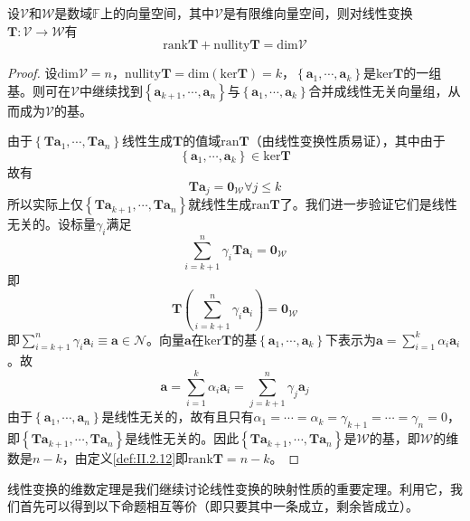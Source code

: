 \documentclass[main.tex]{subfiles}
\begin{document}
\begin{theorem}[线性变换的维数定理]\label{thm:II.2.8}
    设$\mathcal{V}$和$\mathcal{W}$是数域$\mathbb{F}$上的向量空间，其中$\mathcal{V}$是有限维向量空间，则对线性变换$\mathbf{T}:\mathcal{V}\rightarrow\mathcal{W}$有
    \[
        \mathrm{rank}\mathbf{T}+\mathrm{nullity}\mathbf{T}=\mathrm{dim}\mathcal{V}
    \]
\end{theorem}
\begin{proof}
    设$\mathrm{dim}\mathcal{V}=n$，$\mathrm{nullity}\mathbf{T}=\mathrm{dim}\left(\mathrm{ker}\mathbf{T}\right)=k$，$\left\{\mathbf{a}_1,\cdots,\mathbf{a}_k\right\}$是$\mathrm{ker}\mathbf{T}$的一组基。则可在$\mathcal{V}$中继续找到$\left\{\mathbf{a}_{k+1},\cdots,\mathbf{a}_{n}\right\}$与$\left\{\mathbf{a}_1,\cdots,\mathbf{a}_k\right\}$合并成线性无关向量组，从而成为$\mathcal{V}$的基。

    由于$\left\{\mathbf{Ta}_1,\cdots,\mathbf{Ta}_n\right\}$线性生成$\mathbf{T}$的值域$\mathrm{ran}\mathbf{T}$（由线性变换性质易证），其中由于
    \[\left\{\mathbf{a}_1,\cdots,\mathbf{a}_k\right\}\in\mathrm{ker}\mathbf{T}\]
    故有
    \[\mathbf{Ta}_j=\mathbf{0}_{\mathcal{W}}\forall j\leq k\]
    所以实际上仅$\left\{\mathbf{Ta}_{k+1},\cdots,\mathbf{Ta}_n\right\}$就线性生成$\mathrm{ran}\mathbf{T}$了。我们进一步验证它们是线性无关的。设标量$\gamma_i$满足
    \[\sum_{i=k+1}^n\gamma_i\mathbf{Ta}_i=\mathbf{0}_{\mathcal{W}}\]
    即
    \[\mathbf{T}\left(\sum_{i=k+1}^n\gamma_i\mathbf{a}_i\right)=\mathbf{0}_{\mathcal{W}}\]
    即$\sum_{i=k+1}^n\gamma_i\mathbf{a}_i\equiv\mathbf{a}\in\mathcal{N}$。向量$\mathbf{a}$在$\mathrm{ker}\mathbf{T}$的基$\left\{\mathbf{a}_1,\cdots,\mathbf{a}_k\right\}$下表示为$\mathbf{a}=\sum_{i=1}^k\alpha_i\mathbf{a}_i$。故
    \[
        \mathbf{a}=\sum_{i=1}^k\alpha_i\mathbf{a}_i=\sum_{j=k+1}^n\gamma_j\mathbf{a}_j
    \]
    由于$\left\{\mathbf{a}_1,\cdots,\mathbf{a}_n\right\}$是线性无关的，故有且只有$\alpha_1=\cdots=\alpha_k=\gamma_{k+1}=\cdots=\gamma_n=0$，即$\left\{\mathbf{Ta}_{k+1},\cdots,\mathbf{Ta}_n\right\}$是线性无关的。因此$\left\{\mathbf{Ta}_{k+1},\cdots,\mathbf{Ta}_n\right\}$是$\mathcal{W}$的基，即$\mathcal{W}$的维数是$n-k$，由定义\ref{def:II.2.12}即$\mathrm{rank}\mathbf{T}=n-k$。
\end{proof}

线性变换的维数定理是我们继续讨论线性变换的映射性质的重要定理。利用它，我们首先可以得到以下命题相互等价（即只要其中一条成立，剩余皆成立）。
\end{document}
